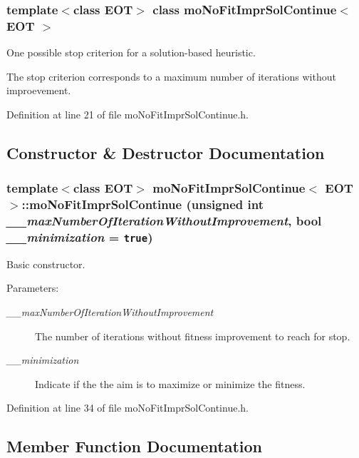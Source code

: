\subsubsection*{template$<$class EOT$>$ class moNoFitImprSolContinue$<$ EOT $>$}

One possible stop criterion for a solution-based heuristic. 

The stop criterion corresponds to a maximum number of iterations without improevement. 



Definition at line 21 of file moNoFitImprSolContinue.h.

\subsection{Constructor \& Destructor Documentation}
\subsubsection{\setlength{\rightskip}{0pt plus 5cm}template$<$class EOT$>$ {\bf moNoFitImprSolContinue}$<$ EOT $>$::{\bf moNoFitImprSolContinue} (unsigned int {\em \_\-\_\-maxNumberOfIterationWithoutImprovement}, bool {\em \_\-\_\-minimization} = {\tt true})\hspace{0.3cm}{\tt  [inline]}}\label{classmo_no_fit_impr_sol_continue_6246733469ea1b5001bf4c567e3dfdcb}


Basic constructor. 

\begin{Desc}
\item[Parameters:]
\begin{description}
\item[{\em \_\-\_\-maxNumberOfIterationWithoutImprovement}]The number of iterations without fitness improvement to reach for stop. \item[{\em \_\-\_\-minimization}]Indicate if the the aim is to maximize or minimize the fitness. \end{description}
\end{Desc}


Definition at line 34 of file moNoFitImprSolContinue.h.

\subsection{Member Function Documentation}

